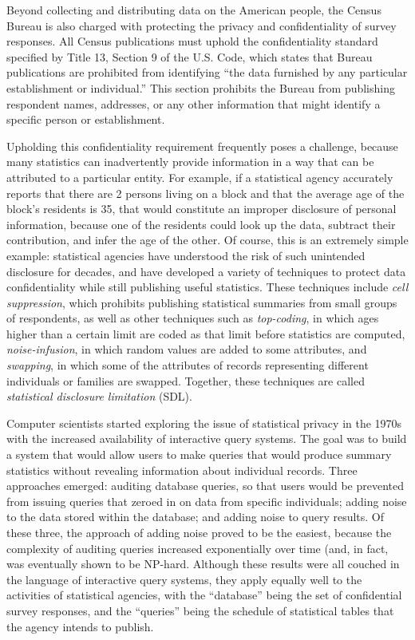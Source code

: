 \documentclass[runningheads]{llncs}
\begin{document}
Beyond collecting and distributing data on the American
people, the Census Bureau is also charged with protecting the privacy and confidentiality of
survey responses. All Census publications must uphold the
confidentiality standard specified by Title 13, Section 9 of the U.S. Code, which
states that Bureau publications are prohibited from
identifying ``the data furnished by any particular
establishment or individual.'' This section
prohibits the Bureau from publishing respondent names, addresses, or any other
information that might identify a specific person or establishment.

Upholding this confidentiality requirement frequently poses a
challenge, because many statistics can inadvertently provide
information in a way that can be attributed to a particular
entity. For example, if a statistical agency accurately reports that
there are 2 persons living on a block and that the average age of the
block's residents is 35, that would constitute an improper disclosure
of personal information, because one of the residents could look up
the data, subtract their contribution, and infer the age of the other. Of course, this is an extremely simple example: 
statistical agencies have understood the risk of such unintended disclosure for decades, and have developed a variety of techniques to protect data confidentiality while still publishing useful statistics. These techniques include \emph{cell suppression}, which prohibits publishing statistical summaries from small groups of respondents, as well as other techniques such as \emph{top-coding}, in which ages higher than a certain limit are coded
as that limit before statistics are computed, \emph{noise-infusion}, in which random values are added
to some attributes, and \emph{swapping}, in which some of the
attributes of records representing different individuals or families
are swapped. Together, these techniques are called \emph{statistical
  disclosure limitation} (SDL).
  
Computer scientists started exploring the issue of statistical privacy in the 1970s with the increased availability of interactive query systems. The goal was to build a system that would allow users to make queries that would produce summary statistics without revealing information about individual records. Three approaches emerged: auditing database queries, so that users would be prevented from issuing queries that zeroed in on data from specific individuals; adding noise to the data stored within the database; and adding noise to query results\cite{Adam:1989:SMS:76894.76895}. Of these three, the approach of adding noise proved to be the easiest, because the complexity of auditing queries increased exponentially over time (and, in fact, was eventually shown to be NP-hard\cite{Kleinberg:2000:ABA:335168.335210}. Although these results were all couched in the language of interactive query systems, they apply equally well to the activities of statistical agencies, with the ``database'' being the set of confidential survey responses, and the ``queries'' being the schedule of statistical tables that the agency intends to publish.
\end{document}
